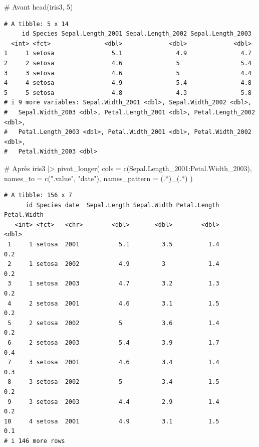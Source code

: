 \documentclass[
  letterpaper,
]{book}
\newenvironment{Shaded}{\begin{snugshade}}{\end{snugshade}}
\newcommand{\AttributeTok}[1]{\textcolor[rgb]{0.40,0.45,0.13}{#1}}
\newcommand{\CommentTok}[1]{\textcolor[rgb]{0.37,0.37,0.37}{#1}}
\newcommand{\DecValTok}[1]{\textcolor[rgb]{0.68,0.00,0.00}{#1}}
\newcommand{\FunctionTok}[1]{\textcolor[rgb]{0.28,0.35,0.67}{#1}}
\newcommand{\NormalTok}[1]{\textcolor[rgb]{0.00,0.23,0.31}{#1}}
\newcommand{\SpecialCharTok}[1]{\textcolor[rgb]{0.37,0.37,0.37}{#1}}
\newcommand{\StringTok}[1]{\textcolor[rgb]{0.13,0.47,0.30}{#1}}
\begin{document}
\begin{Shaded}
\begin{Highlighting}[]
\CommentTok{\# Avant}
\FunctionTok{head}\NormalTok{(iris3, }\DecValTok{5}\NormalTok{)}
\end{Highlighting}
\end{Shaded}

\begin{verbatim}
# A tibble: 5 x 14
     id Species Sepal.Length_2001 Sepal.Length_2002 Sepal.Length_2003
  <int> <fct>               <dbl>             <dbl>             <dbl>
1     1 setosa                5.1               4.9               4.7
2     2 setosa                4.6               5                 5.4
3     3 setosa                4.6               5                 4.4
4     4 setosa                4.9               5.4               4.8
5     5 setosa                4.8               4.3               5.8
# i 9 more variables: Sepal.Width_2001 <dbl>, Sepal.Width_2002 <dbl>,
#   Sepal.Width_2003 <dbl>, Petal.Length_2001 <dbl>, Petal.Length_2002 <dbl>,
#   Petal.Length_2003 <dbl>, Petal.Width_2001 <dbl>, Petal.Width_2002 <dbl>,
#   Petal.Width_2003 <dbl>
\end{verbatim}

\begin{Shaded}
\begin{Highlighting}[]
\CommentTok{\# Après}
\NormalTok{iris3 }\SpecialCharTok{|\textgreater{}} 
  \FunctionTok{pivot\_longer}\NormalTok{(}
    \AttributeTok{cols =} \FunctionTok{c}\NormalTok{(Sepal.Length\_2001}\SpecialCharTok{:}\NormalTok{Petal.Width\_2003),}
    \AttributeTok{names\_to =} \FunctionTok{c}\NormalTok{(}\StringTok{".value"}\NormalTok{, }\StringTok{"date"}\NormalTok{),}
    \AttributeTok{names\_pattern =} \StringTok{\textquotesingle{}(.*)\_(.*)\textquotesingle{}}
\NormalTok{  )}
\end{Highlighting}
\end{Shaded}

\begin{verbatim}
# A tibble: 156 x 7
      id Species date  Sepal.Length Sepal.Width Petal.Length Petal.Width
   <int> <fct>   <chr>        <dbl>       <dbl>        <dbl>       <dbl>
 1     1 setosa  2001           5.1         3.5          1.4         0.2
 2     1 setosa  2002           4.9         3            1.4         0.2
 3     1 setosa  2003           4.7         3.2          1.3         0.2
 4     2 setosa  2001           4.6         3.1          1.5         0.2
 5     2 setosa  2002           5           3.6          1.4         0.2
 6     2 setosa  2003           5.4         3.9          1.7         0.4
 7     3 setosa  2001           4.6         3.4          1.4         0.3
 8     3 setosa  2002           5           3.4          1.5         0.2
 9     3 setosa  2003           4.4         2.9          1.4         0.2
10     4 setosa  2001           4.9         3.1          1.5         0.1
# i 146 more rows
\end{verbatim}
\end{document}
